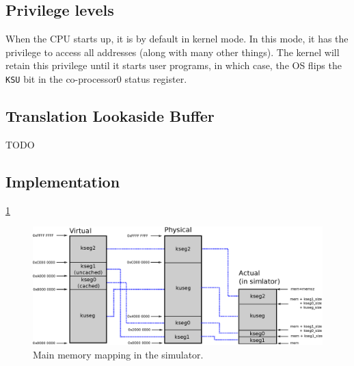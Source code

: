 \subsection{Privilege levels}
When the CPU starts up, it is by default in kernel mode. In this mode, it has
the privilege to access all addresses (along with many other things). The
kernel will retain this privilege until it starts user programs, in which case,
the OS flips the \texttt{KSU} bit in the co-processor0 status register\cite{harvard_mips_summary}.

\subsection{Translation Lookaside Buffer}
TODO

\subsection{Implementation}
\ref{fig:address_space_mapping}

\begin{figure}[ht]
	\centering
	\includegraphics[scale=0.70]{mmu/memory_mapping.eps}
	\caption{Main memory mapping in the simulator.}
	\label{fig:address_space_mapping}
\end{figure}
